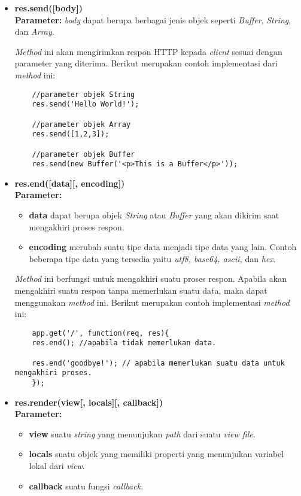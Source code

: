 \begin{itemize}
	\item \textbf{res.send([body])} \\ \textbf{Parameter:} \textit{body} dapat berupa berbagai jenis objek seperti \textit{Buffer}, \textit{String}, dan \textit{Array}.
	
	\textit{Method} ini akan mengirimkan respon HTTP kepada \textit{client} sesuai dengan parameter yang diterima. Berikut merupakan contoh implementasi dari \textit{method} ini:
	\begin{lstlisting}
	//parameter objek String
	res.send('Hello World!');
	
	//parameter objek Array
	res.send([1,2,3]);
	
	//parameter objek Buffer
	res.send(new Buffer('<p>This is a Buffer</p>'));
	\end{lstlisting}
	
	\item \textbf{res.end([data][, encoding])} \\ \textbf{Parameter:}
	\begin{itemize}
		\item \textbf{data} dapat berupa objek \textit{String} atau \textit{Buffer} yang akan dikirim saat mengakhiri proses respon.
		\item \textbf{encoding} merubah suatu tipe data menjadi tipe data yang lain. Contoh beberapa tipe data yang tersedia yaitu \textit{utf8, base64, ascii, } dan \textit{hex}.
	\end{itemize}
	
	\textit{Method} ini berfungsi untuk mengakhiri suatu proses respon. Apabila akan mengakhiri suatu respon tanpa memerlukan suatu data, maka dapat menggunakan \textit{method} ini. Berikut merupakan contoh implementasi \textit{method} ini:
	\begin{lstlisting}
	app.get('/', function(req, res){
	res.end(); //apabila tidak memerlukan data.
	
	res.end('goodbye!'); // apabila memerlukan suatu data untuk mengakhiri proses.
	});
	\end{lstlisting}
	
	\item \textbf{res.render(view[, locals][, callback])} \\ \textbf{Parameter:}
	\begin{itemize}
		\item \textbf{view} suatu \textit{string} yang menunjukan \textit{path} dari suatu \textit{view file}.
		\item \textbf{locals} suatu objek yang memiliki properti yang menunjukan variabel lokal dari \textit{view}.
		\item \textbf{callback} suatu fungsi \textit{callback}. 
	\end{itemize}
	

\end{itemize}
